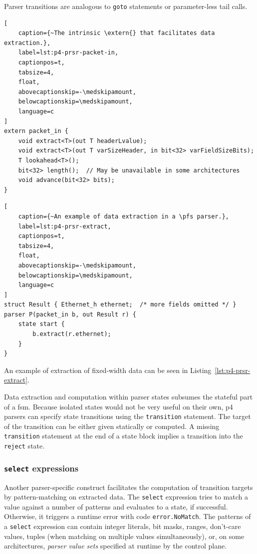 Parser transitions are analogous to \texttt{goto} statements or parameter-less
tail calls.

\begin{lstlisting}[
	caption={~The intrinsic \extern{} that facilitates data extraction.},
	label=lst:p4-prsr-packet-in,
	captionpos=t,
	tabsize=4,
	float,
	abovecaptionskip=-\medskipamount,
	belowcaptionskip=\medskipamount,
	language=c
]
extern packet_in {
	void extract<T>(out T headerLvalue);
	void extract<T>(out T varSizeHeader, in bit<32> varFieldSizeBits);
	T lookahead<T>();
	bit<32> length();  // May be unavailable in some architectures
	void advance(bit<32> bits);
}
\end{lstlisting}

\begin{lstlisting}[
	caption={~An example of data extraction in a \pfs parser.},
	label=lst:p4-prsr-extract,
	captionpos=t,
	tabsize=4,
	float,
	abovecaptionskip=-\medskipamount,
	belowcaptionskip=\medskipamount,
	language=c
]
struct Result { Ethernet_h ethernet;  /* more fields omitted */ }
parser P(packet_in b, out Result r) {
	state start {
		b.extract(r.ethernet);
	}
}
\end{lstlisting}

An example of extraction of fixed-width data can be seen in
Listing~\ref{lst:p4-prsr-extract}.

Data extraction and computation within parser states subsumes the stateful part
of a \acrlong{fsm}. Because isolated states would not be very useful on their
own, \acrshort{p4} parsers can specify state transitions using the
\texttt{transition} statement. The target of the transition can be either given
statically or computed. A missing \texttt{transition} statement at the end of a
state block implies a transition into the \texttt{reject} state.

\subsubsection*{\texttt{select} expressions}

Another parser-specific construct facilitates the computation of transition
targets by pattern-matching on extracted data. The \texttt{select} expression
tries to match a value against a number of patterns and evaluates to a state, if
successful. Otherwise, it triggers a runtime error with code
\texttt{error.NoMatch}.
The patterns of a \texttt{select} expression can contain integer literals, bit
masks, ranges, don't-care values, tuples (when matching on multiple values
simultaneously), or, on some architectures, \textit{parser value sets} specified
at runtime by the control plane.

